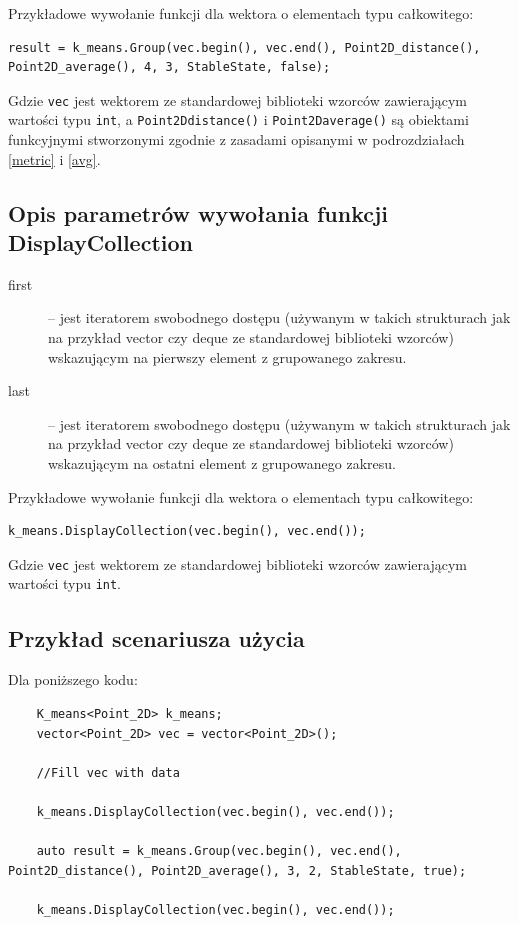 Przykładowe wywołanie funkcji dla wektora o elementach typu całkowitego:

	\begin{lstlisting}	
result = k_means.Group(vec.begin(), vec.end(), Point2D_distance(), Point2D_average(), 4, 3, StableState, false);
	\end{lstlisting}

Gdzie \texttt{vec} jest wektorem ze standardowej biblioteki wzorców zawierającym wartości typu \texttt{int}, a \texttt{Point2D\textunderscore distance()} i \texttt{Point2D\textunderscore average()} są obiektami funkcyjnymi stworzonymi zgodnie z zasadami opisanymi w podrozdziałach \ref{metric} i \ref{avg}.

\subsection{Opis parametrów wywołania funkcji DisplayCollection}

\begin{description}
	\item[first] -- jest iteratorem swobodnego dostępu (używanym w takich strukturach jak na przykład vector czy deque ze standardowej biblioteki wzorców) wskazującym na pierwszy element z grupowanego zakresu.
	\item[last] -- jest iteratorem swobodnego dostępu (używanym w takich strukturach jak na przykład vector czy deque ze standardowej biblioteki wzorców) wskazującym na ostatni element z grupowanego zakresu.
\end{description}

Przykładowe wywołanie funkcji dla wektora o elementach typu całkowitego:

\begin{lstlisting}	
k_means.DisplayCollection(vec.begin(), vec.end());
\end{lstlisting}

Gdzie \texttt{vec} jest wektorem ze standardowej biblioteki wzorców zawierającym wartości typu \texttt{int}.

\subsection{Przykład scenariusza użycia}

Dla poniższego kodu:

\begin{lstlisting}	
	K_means<Point_2D> k_means;
	vector<Point_2D> vec = vector<Point_2D>();
	
	//Fill vec with data
	
	k_means.DisplayCollection(vec.begin(), vec.end());
	
	auto result = k_means.Group(vec.begin(), vec.end(), Point2D_distance(), Point2D_average(), 3, 2, StableState, true);
	
	k_means.DisplayCollection(vec.begin(), vec.end());
\end{lstlisting}

